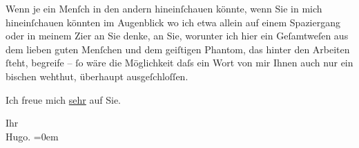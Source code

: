\pstart
           Wenn je ein Menſch in den andern hineinſchauen könnte, wenn Sie in mich hineinſchauen
               könnten im Augenblick wo ich etwa allein auf einem Spaziergang oder in meinem Zi{\geminationm}er an Sie denke, an Sie, worunter ich hier ein
               Geſamtweſen aus dem lieben guten Menſchen und dem geiſtigen Phantom, das hinter den
               Arbeiten{ }ſteht, begreife –{ }ſo wäre die Möglichkeit daſs ein Wort von mir Ihnen auch
               nur ein bischen wehthut, überhaupt ausgeſchloſſen.\pend
           
\pstart
           Ich freue mich \uline{sehr} auf Sie.\pend
           
\pstart
           Ihr{\\[\baselineskip]}\spacefill\mbox{Hugo.}\pend
           \leftskip=0em{}\endnumbering{}  \newcommand{\dateiname}{L01789}\newcommand{\titel}{Hugo von Hofmannsthal an Arthur Schnitzler, 14. 9. [1908]}\newcommand{\editorInnen}{Martin Anton Müller und Gerd-Hermann Susen}
